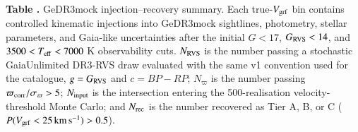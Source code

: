 \begin{center}
\label{tab:recovery_summary}
\begin{minipage}{\columnwidth}
\small\textbf{Table \thetable.} GeDR3mock injection--recovery summary.  Each true-$V_{\rm grf}$ bin contains controlled kinematic injections into GeDR3mock sightlines, photometry, stellar parameters, and Gaia-like uncertainties after the initial $G<17$, $G_{\rm RVS}<14$, and $3500<T_{\rm eff}<7000$ K observability cuts.  $N_{\rm RVS}$ is the number passing a stochastic GaiaUnlimited DR3-RVS draw evaluated with the same v1 convention used for the catalogue, $g=G_{\rm RVS}$ and $c=BP{-}RP$; $N_{\varpi}$ is the number passing $\varpi_{\rm corr}/\sigma_\varpi>5$; $N_{\rm input}$ is the intersection entering the 500-realisation velocity-threshold Monte Carlo; and $N_{\rm rec}$ is the number recovered as Tier A, B, or C ($P(V_{\rm grf}<25\,{\rm km\,s^{-1}})>0.5$).
\end{minipage}
\vspace{0.4ex}

\scriptsize
\setlength{\tabcolsep}{4pt}
\end{center}
